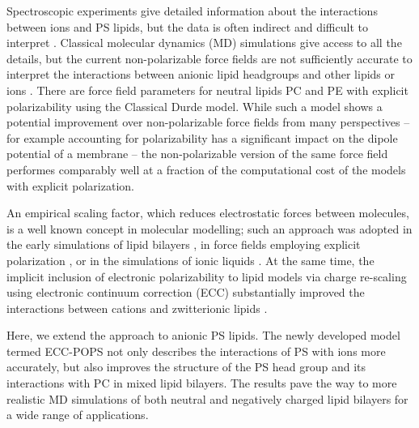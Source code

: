 \documentclass[journal=jpcbfk,manuscript=article]{achemso}
\begin{document}
Spectroscopic experiments give detailed information about the
interactions between ions and PS lipids, but the data is often indirect and difficult to
interpret \cite{hauser77,kurland79,eisenberg79,hauser83,dluhy83,hauser85,feigenson86,mattai89,roux90,roux91,boettcher11}.
Classical molecular dynamics (MD) simulations give
access to all the details, but the current non-polarizable force fields are not
sufficiently accurate to interpret the interactions between anionic
lipid headgroups and other lipids or ions \cite{NMRlipidsIV}.
There are force field parameters for neutral lipids PC and PE 
with explicit polarizability using the Classical Durde model. \cite{chowdhary13, chowdhary17}
While such a model shows a potential improvement over non-polarizable force fields from many perspectives -- 
for example accounting for polarizability has a significant impact on the dipole potential of a membrane \cite{harder2009} -- 
the non-polarizable version of the same force field 
performes comparably well at a fraction of the computational cost 
of the models with explicit polarization. \citep{lucas12,chowdhary13} 

An empirical scaling factor, which reduces electrostatic forces between molecules, 
is a well known concept in molecular modelling;
such an approach was adopted in the early simulations of lipid bilayers \cite{egberts94, berendsen1996},
in force fields employing explicit polarization \cite{lemkul2016empirical},
or in the simulations of ionic liquids \cite{Bhargava2007}. 
At the same time, 
the implicit inclusion of electronic polarizability to lipid models
via charge re-scaling using electronic continuum correction (ECC) 
substantially improved the interactions between cations and zwitterionic lipids \cite{melcr18}. 


Here, we extend the approach to anionic PS lipids.
The newly developed model termed ECC-POPS 
not only describes the interactions of PS with ions more accurately, 
but also improves the structure of the PS head group 
and its interactions with PC in mixed lipid bilayers. 
The results pave the way to more realistic MD simulations 
of both neutral and negatively charged lipid bilayers 
for a wide range of applications.
\end{document}
